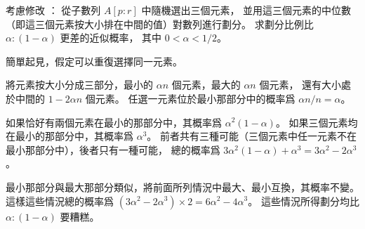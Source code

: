 \DIFFICULT
考慮修改 ：
從子數列 $A[p:r]$ 中隨機選出三個元素，
並用這三個元素的中位數（即這三個元素按大小排在中間的值）對數列進行劃分。
求劃分比例比 $\alpha:(1-\alpha)$ 更差的近似概率，
其中 $0<\alpha<1/2$。
\stopEXERCISE

\startANSWER
簡單起見，假定可以重復選擇同一元素。

將元素按大小分成三部分，最小的 $\alpha n$ 個元素，最大的 $\alpha n$ 個元素，
還有大小處於中間的 $1-2\alpha n$ 個元素。
任選一元素位於最小那部分中的概率爲 $\alpha n/n = \alpha$。

如果恰好有兩個元素在最小的那部分中，其概率爲 $\alpha^2(1-\alpha)$。
如果三個元素均在最小的那部分中，其概率爲 $\alpha^3$。
前者共有三種可能（三個元素中任一元素不在最小那部分中），後者只有一種可能，
總的概率爲 $3\alpha^2(1-\alpha)+\alpha^3 = 3\alpha^2-2\alpha^3$。

最小那部分與最大那部分類似，將前面所列情況中最大、最小互換，其概率不變。
這樣這些情況總的概率爲 $(3\alpha^2-2\alpha^3) \times 2 = 6\alpha^2-4\alpha^3$。
這些情況所得劃分均比 $\alpha:(1-\alpha)$ 要糟糕。
\stopANSWER
